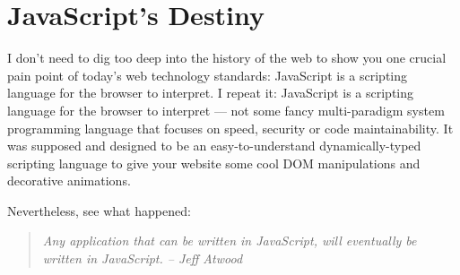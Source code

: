 \documentclass[11pt]{article}
\begin{document}
\section{JavaScript’s Destiny}
\label{sec:javascript-destiny}

I don’t need to dig too deep into the history of the web to show you one crucial pain point of today’s web technology standards: JavaScript is a scripting language for the browser to interpret. I repeat it: JavaScript is a scripting language for the browser to interpret — not some fancy multi-paradigm system programming language that focuses on speed, security or code maintainability. It was supposed and designed to be an easy-to-understand dynamically-typed scripting language to give your website some cool DOM manipulations and decorative animations.

Nevertheless, see what happened:

\begin{quote}
  \emph{Any application that can be written in JavaScript, will eventually be written in JavaScript. – Jeff Atwood}
\end{quote}

\pagebreak


\end{document}
